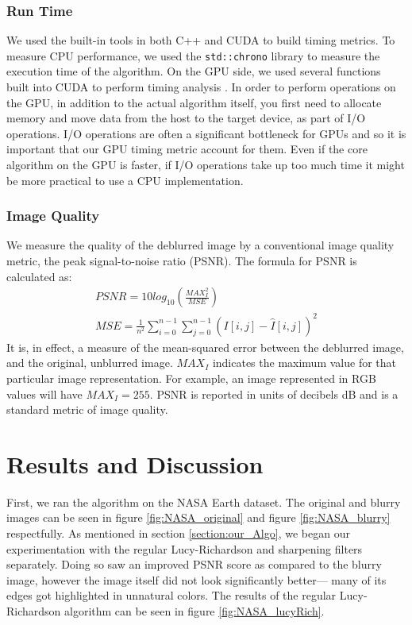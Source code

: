 \documentclass{article}
\begin{document}
\subsubsection{Run Time}
We used the built-in tools in both C++ and CUDA to build timing metrics. To measure CPU performance, we used the \texttt{std::chrono} library to measure the execution time of the algorithm.  On the GPU side, we used several functions built into CUDA to perform timing analysis \cite{gputime}. In order to perform operations on the GPU, in addition to the actual algorithm itself, you first need to allocate memory and move data from the host to the target device, as part of I/O operations. I/O operations are often a significant  bottleneck for GPUs and so it is important that our GPU timing metric account for them. Even if the core algorithm on the GPU is faster, if I/O operations take up too much time it might be more practical to use a CPU implementation. 

\subsubsection{Image Quality}
We measure the quality of the deblurred image by a conventional image quality metric, the peak signal-to-noise ratio (PSNR). The formula for PSNR is calculated as:
\begin{equation}
\begin{align} 
PSNR = 10log_{10}\left(\frac{MAX_I^2}{MSE} \right) \\
MSE = \frac{1}{n^2}\sum_{i=0}^{n-1} \sum_{j=0}^{n-1} \left(I[i,j]- \hat{I}[i,j]\right)^2
\end{align}
\end{equation}
It is, in effect, a measure of the mean-squared error between the deblurred image, and the original, unblurred image. $MAX_I$ indicates the maximum value for that particular image representation. For example, an image represented in RGB values will have $MAX_I = 255$. PSNR is reported in units of decibels dB and is a standard metric of image quality. 

\section{Results and Discussion} 
First, we ran the algorithm on the NASA Earth dataset.
The original and blurry images can be seen in figure \ref{fig:NASA_original} and figure \ref{fig:NASA_blurry} respectfully.
As mentioned in section \ref{section:our_Algo}, we began our experimentation with the regular Lucy-Richardson and sharpening filters separately. Doing so saw an improved PSNR score as compared to the blurry image, however the image itself did not look significantly better— many of its edges got highlighted in unnatural colors. The results of the regular Lucy-Richardson algorithm can be seen in figure \ref{fig:NASA_lucyRich}.
\end{document}

